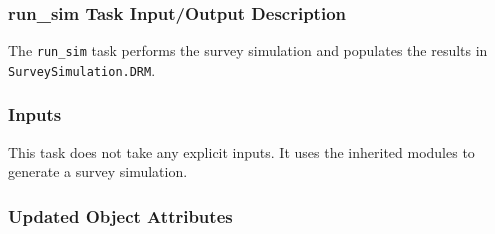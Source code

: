 \documentclass[cleanfoot]{asme2ej}
\begin{document}
\subsubsection{run\_sim Task Input/Output Description} \label{sec:runsimtask}
The \verb+run_sim+ task performs the survey simulation and populates the results in \verb+SurveySimulation.DRM+.

\subsubsection*{Inputs}
This task does not take any explicit inputs.  It uses the inherited modules to generate a survey simulation.

\subsubsection*{Updated Object Attributes}
\end{document}
